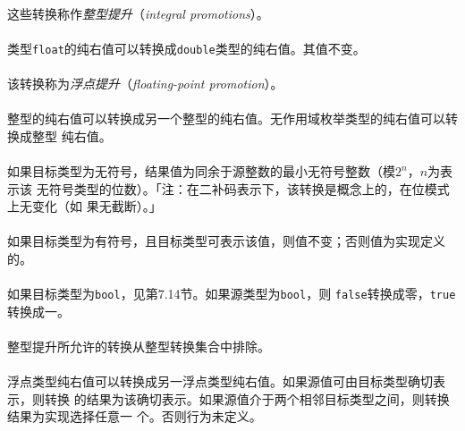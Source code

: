 \paragraph{}
这些转换称作\textit{整型提升}（\textit{integral promotions}）。

\paragraph{}
类型\texttt{float}的纯右值可以转换成\texttt{double}类型的纯右值。其值不变。

\paragraph{}
该转换称为\textit{浮点提升}（\textit{floating-point promotion}）。

\paragraph{}
整型的纯右值可以转换成另一个整型的纯右值。无作用域枚举类型的纯右值可以转换成整型
纯右值。

\paragraph{}
如果目标类型为无符号，结果值为同余于源整数的最小无符号整数（模$2^n$，$n$为表示该
无符号类型的位数）。「注：在二补码表示下，该转换是概念上的，在位模式上无变化（如
果无截断）。」

\paragraph{}
如果目标类型为有符号，且目标类型可表示该值，则值不变；否则值为实现定义的。

\paragraph{}
如果目标类型为\texttt{bool}，见第7.14节。如果源类型为\texttt{bool}，则
\texttt{false}转换成零，\texttt{true}转换成一。

\paragraph{}
整型提升所允许的转换从整型转换集合中排除。

\paragraph{}
浮点类型纯右值可以转换成另一浮点类型纯右值。如果源值可由目标类型确切表示，则转换
的结果为该确切表示。如果源值介于两个相邻目标类型之间，则转换结果为实现选择任意一
个。否则行为未定义。

